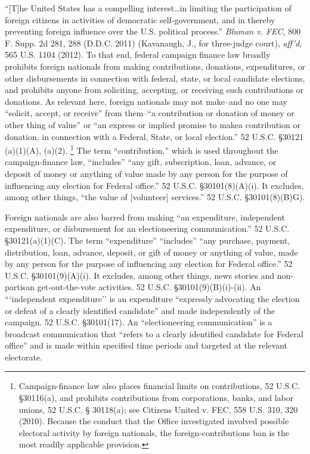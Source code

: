 ``[T]he United States has a compelling interest\dots in limiting the participation of foreign citizens in activities of democratic self-government, and in thereby preventing foreign influence over the U.S. political process.''
\textit{Bluman v. FEC}, 800 F. Supp. 2d 281, 288 (D.D.C. 2011) (Kavanaugh, J., for three-judge court), \textit{aff'd}, 565 U.S. 1104 (2012).
To that end, federal campaign finance law broadly prohibits foreign nationals from making contributions, donations, expenditures, or other disbursements in connection with federal, state, or local candidate elections, and prohibits anyone from soliciting, accepting, or receiving such contributions or donations.
As relevant here, foreign nationals may not make--and no one may ``solicit, accept, or receive'' from them--``a contribution or donation of money or other thing of value'' or ``an express or implied promise to makea contribution or donation, in connection with a Federal, State, or local election.''
52 U.S.C. \S 30121 (a)(1)(A), (a)(2).%
\footnote{Campaign-finance law also places financial limits on contributions, 52 U.S.C. \S 30116(a), and prohibits contributions from corporations, banks, and labor unions, 52 U.S.C. § 30118(a);
see Citizens United v. FEC, 558 U.S. 310, 320 (2010).
Because the conduct that the Office investigated involved possible electoral activity by foreign nationals, the foreign-contributions ban is the most readily applicable provision.}
The term ``contribution,'' which is used throughout the campaign-finance law, ``includes'' ``any gift, subscription, loan, advance, or deposit of money or anything of value made by any person for the purpose of influencing any election for Federal office.''
52 U.S.C. \S 30101(8)(A)(i).
It excludes, among other things, ``the value of [volunteer] services.'' 52 U.S.C. \S 30101(8)(B)G).

Foreign nationals are also barred from making ``an expenditure, independent expenditure, or disbursement for an electioneering communication.''
52 U.S.C. \S 30121(a)(1)(C).
The term ``expenditure'' ``includes'' ``any purchase, payment, distribution, loan, advance, deposit, or gift of money or anything of value, made by any person for the purpose of influencing any election for Federal office.''
52 U.S.C. \S 30101(9)(A)(i).
It excludes, among other things, news stories and non-partisan get-out-the-vote activities.
52 U.S.C. \S 30101(9)(B)(i)-(ii).
An ```independent expenditure'' is an expenditure ``expressly advocating the election or defeat of a clearly identified candidate'' and made independently of the campaign.
52 U.S.C. \S 30101(17).
An ``electioneering communication'' is a broadcast communication that ``refers to a clearly identified candidate for Federal office'' and is made within specified time periods and targeted at the relevant electorate.

